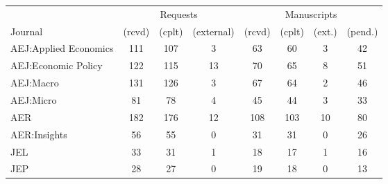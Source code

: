 
\begin{tabular}{@{\extracolsep{5pt}} lccccccc} 
\toprule 
        & \multicolumn{3}{c}{Requests} & \multicolumn{4}{c}{Manuscripts}\\
\cmidrule{2-4}\cmidrule{5-8}

Journal & (rcvd) & (cplt) & (external) & (rcvd) & (cplt) & (ext.) & (pend.) \\ 
\midrule 
AEJ:Applied Economics & 111 & 107 & 3 & 63 & 60 & 3 & 42 \\ 
AEJ:Economic Policy & 122 & 115 & 13 & 70 & 65 & 8 & 51 \\ 
AEJ:Macro & 131 & 126 & 3 & 67 & 64 & 2 & 46 \\ 
AEJ:Micro & 81 & 78 & 4 & 45 & 44 & 3 & 33 \\ 
AER & 182 & 176 & 12 & 108 & 103 & 10 & 80 \\ 
AER:Insights & 56 & 55 & 0 & 31 & 31 & 0 & 26 \\ 
JEL & 33 & 31 & 1 & 18 & 17 & 1 & 16 \\ 
JEP & 28 & 27 & 0 & 19 & 18 & 0 & 13 \\ 
\bottomrule 
\end{tabular} 
